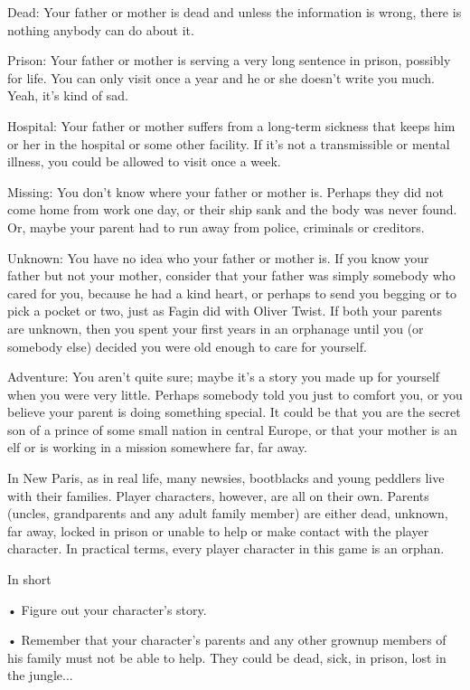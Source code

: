 Dead: Your father or mother is dead and unless the information is wrong, there is nothing anybody can do about it.

Prison: Your father or mother is serving a very long sentence in prison, possibly for life. You can only visit once a year and he or she doesn't write you much. Yeah, it's kind of sad.

Hospital: Your father or mother suffers from a long-term sickness that keeps him or her in the hospital or some other facility. If it's not a transmissible or mental illness, you could be allowed to visit once a week.

Missing: You don't know where your father or mother is. Perhaps they did not come home from work one day, or their ship sank and the body was never found. Or, maybe your parent had to run away from police, criminals or creditors.

Unknown: You have no idea who your father or mother is. If you know your father but not your mother, consider that your father was simply somebody who cared for you, because he had a kind heart, or perhaps to send you begging or to pick a pocket or two, just as Fagin did with Oliver Twist. If both your parents are unknown, then you spent your first years in an orphanage until you (or somebody else) decided you were old enough to care for yourself.

Adventure: You aren't quite sure; maybe it's a story you made up for yourself when you were very little. Perhaps somebody told you just to comfort you, or you believe your parent is doing something special. It could be that you are the secret son of a prince of some small nation in central Europe, or that your mother is an elf or is working in a mission somewhere far, far away.

In New Paris, as in real life, many newsies, bootblacks and young peddlers live with their families. Player characters, however, are all on their own. Parents (uncles, grandparents and any adult family member) are either dead, unknown, far away, locked in prison or unable to help or make contact with the player character. In practical terms, every player character in this game is an orphan.

In short

• Figure out your character's story.

• Remember that your character's parents and any other grownup members of his family must not be able to help. They could be dead, sick, in prison, lost in the jungle...


